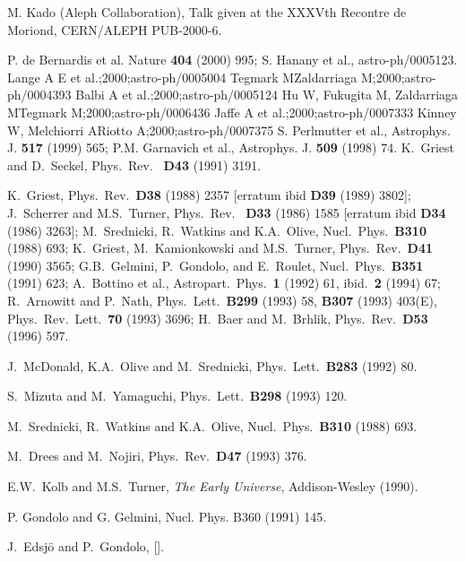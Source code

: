 \begin{thebibliography}{99}
 M. Kado (Aleph Collaboration), Talk given
at the XXXVth Recontre de Moriond, CERN/ALEPH PUB-2000-6.

P. de Bernardis et al. Nature {\bf 404} (2000) 995;
S. Hanany et al., astro-ph/0005123.
\rfprep\nnn  Lange A E et al.;2000;astro-ph/0005004
\rfprep\nn Tegmark M\dualand\nn Zaldarriaga M;2000;astro-ph/0004393
\rfprep\nn  Balbi A et al.;2000;astro-ph/0005124
\rfprep\nn Hu W, \nn Fukugita M,
\nn Zaldarriaga M\multiand\nn Tegmark M;2000;astro-ph/0006436
\rfprep\nn Jaffe A et al.;2000;astro-ph/0007333
\rfprepend\nn Kinney W, \nn Melchiorri A\multiand\nn Riotto 
A;2000;astro-ph/0007375
 S. Perlmutter et al., Astrophys. J. {\bf 517} (1999) 565;
P.M. Garnavich et al., Astrophys. J.  {\bf 509} (1998) 74.
 K.~Griest and D.~Seckel, Phys.\ Rev.\ {\bf 
D43} (1991) 3191.


   K.~Griest, Phys.\ Rev.\ {\bf D38} (1988) 2357 [erratum ibid {\bf
   D39} (1989) 3802]; J.~Scherrer and M.S.~Turner, Phys.\ Rev.\ {\bf
   D33} (1986) 1585 [erratum ibid {\bf D34} (1986) 3263]; M.~Srednicki,
   R.~Watkins and K.A.~Olive, Nucl.\ Phys.\ {\bf B310} (1988) 693;
   K.~Griest, M.~Kamionkowski and M.S.~Turner, Phys.\ Rev.\ {\bf D41}
   (1990) 3565; G.B.~Gelmini, P.~Gondolo, and E.~Roulet, Nucl.\ Phys.\
   {\bf B351} (1991) 623; A.~Bottino et al., Astropart.\ Phys.\ {\bf 1}
   (1992) 61, ibid.\ {\bf 2} (1994) 67; R.~Arnowitt and P.~Nath, Phys.\
   Lett.\ {\bf B299} (1993) 58, {\bf B307} (1993) 403(E), Phys.\ Rev.\
   Lett.\ {\bf 70} (1993) 3696; H.~Baer and M.~Brhlik, Phys.\ Rev.\
   {\bf D53} (1996) 597.

\bibitem{McDonald}
J.~McDonald, K.A.~Olive and M.~Srednicki, Phys.\ Lett.\ {\bf B283}
(1992) 80.

S.~Mizuta and M.~Yamaguchi, Phys.\ Lett.\ {\bf B298} (1993) 120.

M.~Srednicki, R.~Watkins and K.A.~Olive, Nucl.\ Phys.\ {\bf B310} (1988)
693.

M.~Drees and M.~Nojiri, Phys.\ Rev.\ {\bf D47} (1993) 376.

E.W.~Kolb and M.S.~Turner, \emph{The Early Universe},
Addison-Wesley (1990).

P. Gondolo and G. Gelmini, Nucl. Phys. B360 (1991) 145.

 J.~Edsj{\"o} and P.~Gondolo,
\prd{56}{1997}{1879} [].


\end{thebibliography}
